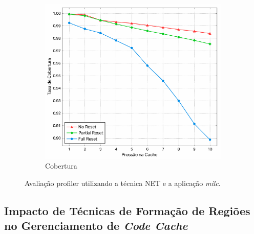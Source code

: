 \documentclass[12pt,twoside]{article}
\begin{document}
\begin{figure}[!ht]
\begin{subfigure}[b]{0.45\textwidth}
                \includegraphics[width=\textwidth]{./figs/reset-dynamic-cov}
                \caption{Cobertura}
                \label{fig-cobertura1}
        \end{subfigure}
\caption{Avaliação profiler utilizando a técnica NET e a aplicação \emph{milc}.}
\end{figure}


\subsection{Impacto de Técnicas de Formação de Regiões no Gerenciamento de \emph{Code Cache}}
\end{document}
